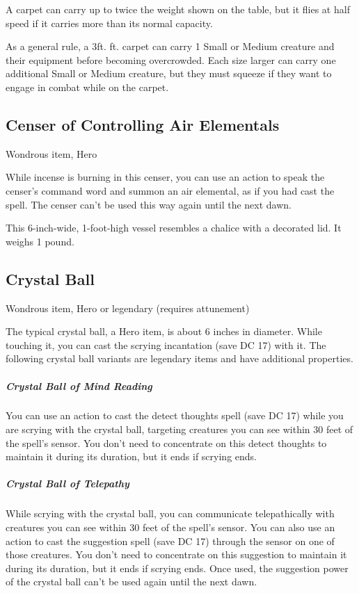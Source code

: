 A carpet can carry up to twice the weight shown on the table, but it flies at half speed if it carries more than its normal capacity.

As a general rule, a 3ft.  ft. carpet can carry 1 Small or Medium creature and their equipment before becoming overcrowded. Each size larger can carry one additional Small or Medium creature, but they must squeeze if they want to engage in combat while on the carpet.

\subsection{Censer of Controlling Air Elementals}
Wondrous item, Hero

While incense is burning in this censer, you can use an action to speak the censer's command word and summon an air elemental, as if you had cast the  spell. The censer can't be used this way again until the next dawn.

This 6-inch-wide, 1-foot-high vessel resembles a chalice with a decorated lid. It weighs 1 pound.

\subsection{Crystal Ball}
Wondrous item, Hero or legendary (requires attunement)

The typical crystal ball, a Hero item, is about 6 inches in diameter. While touching it, you can cast the scrying incantation (save DC 17) with it.
The following crystal ball variants are legendary items and have additional properties.

\subparagraph*{Crystal Ball of Mind Reading} You can use an action to cast the
detect thoughts spell (save DC 17) while you are scrying with the crystal ball, targeting creatures you can see within 30 feet of the spell's sensor. You don't need to concentrate on this detect thoughts to maintain it during its duration, but it ends if scrying ends.

\subparagraph*{Crystal Ball of Telepathy} While scrying with the crystal ball, you can communicate telepathically with creatures you can see within 30 feet of the spell's sensor. You can also use an action to cast the suggestion spell (save DC 17) through the sensor on one of those creatures. You don't need to concentrate on this suggestion to maintain it during its duration, but it ends if scrying ends. Once used, the suggestion power of the crystal ball can't be used again until the next dawn.

